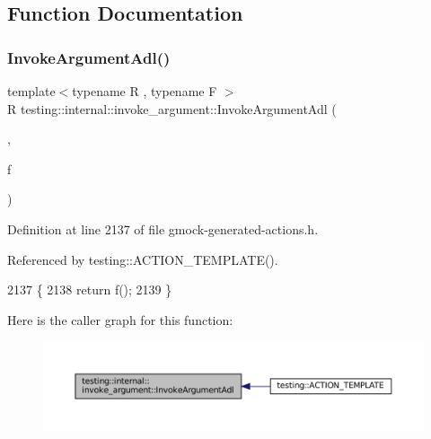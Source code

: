\subsection{Function Documentation}
\mbox{\label{namespacetesting_1_1internal_1_1invoke__argument_a003f0228357c54422037bd3b448b355a}} 
\subsubsection{\texorpdfstring{Invoke\+Argument\+Adl()}{InvokeArgumentAdl()}\hspace{0.1cm}{\footnotesize\ttfamily [1/11]}}
{\footnotesize\ttfamily template$<$typename R , typename F $>$ \\
R testing\+::internal\+::invoke\+\_\+argument\+::\+Invoke\+Argument\+Adl (\begin{DoxyParamCaption}\item[{\hyperlink{structtesting_1_1internal_1_1invoke__argument_1_1AdlTag}{Adl\+Tag}}]{,  }\item[{F}]{f }\end{DoxyParamCaption})}



Definition at line 2137 of file gmock-\/generated-\/actions.\+h.



Referenced by testing\+::\+A\+C\+T\+I\+O\+N\+\_\+\+T\+E\+M\+P\+L\+A\+T\+E().


\begin{DoxyCode}
2137                                  \{
2138   \textcolor{keywordflow}{return} f();
2139 \}
\end{DoxyCode}
Here is the caller graph for this function\+:
\nopagebreak
\begin{figure}[H]
\begin{center}
\leavevmode
\includegraphics[width=350pt]{namespacetesting_1_1internal_1_1invoke__argument_a003f0228357c54422037bd3b448b355a_icgraph}
\end{center}
\end{figure}
\mbox{\label{namespacetesting_1_1internal_1_1invoke__argument_af07db25fc1b7486fb991495863bf1ab8}} 
